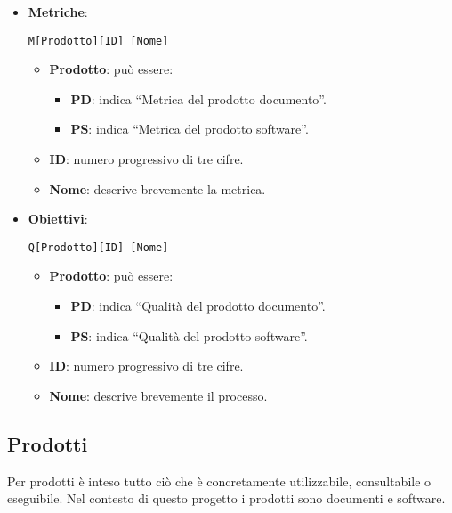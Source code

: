 	\begin{itemize}

		\item \textbf{Metriche}:
		
		\begin{center}
			\texttt{M[Prodotto][ID] [Nome]}
		\end{center}
	
		\begin{itemize}
			\item \textbf{Prodotto}: può essere:
			\begin{itemize}
				\item \textbf{PD}: indica ``Metrica del prodotto documento''.
				\item \textbf{PS}: indica ``Metrica del prodotto software''.
			\end{itemize}
			\item \textbf{ID}: numero progressivo di tre cifre.
			\item \textbf{Nome}: descrive brevemente la metrica.
		\end{itemize}

		\item \textbf{Obiettivi}: 
		
		\begin{center}
			\texttt{Q[Prodotto][ID] [Nome]}
		\end{center} 
		
		\begin{itemize}
			\item \textbf{Prodotto}: può essere:
			\begin{itemize}
				\item \textbf{PD}: indica ``Qualità del prodotto documento''.
				\item \textbf{PS}: indica ``Qualità del prodotto software''.
			\end{itemize}
			\item \textbf{ID}: numero progressivo di tre cifre.
			\item \textbf{Nome}: descrive brevemente il processo.
		\end{itemize}
		
		
	\end{itemize}


\subsection{Prodotti} 
Per prodotti è inteso tutto ciò che è concretamente utilizzabile, consultabile o eseguibile.
Nel contesto di questo progetto i prodotti sono documenti e software.

